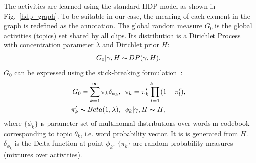 The activities are learned using the standard HDP model as shown in Fig.~\ref{hdp_graph}. To be suitable in our case, the meaning of each element in the graph is redefined as the annotation. The global random measure $G_0$ is the global activities (topics) set shared by all clips. Its distribution is a Dirichlet Process with concentration parameter $\lambda$ and Dirichlet prior $H$:
\begin{equation*}
	G_0|\gamma,H \thicksim DP(\gamma,H),
\end{equation*}
$G_0$ can be expressed using the stick-breaking formulation~\cite{teh2006hdp}:
\begin{align*}
	G_0 = \sum^\infty_{k=1}\pi _k\delta_{\phi_k},&~~\pi_k =\pi _k'\prod^{k-1}_{l=1}(1-\pi _l'),\\
	\pi_k'\thicksim Beta(1,\lambda),&~~\phi_k|\gamma,H \thicksim H,
\end{align*}
where $\{\phi_k\}$ is parameter set of multinomial distributions over words in codebook corresponding to topic $\theta_k$, i.e. word probability vector. It is is generated from $H$. $\delta_{\phi_k}$ is the Delta function at point $\phi_k$. $\{\pi_k\}$ are random probability measures (mixtures over activities).

